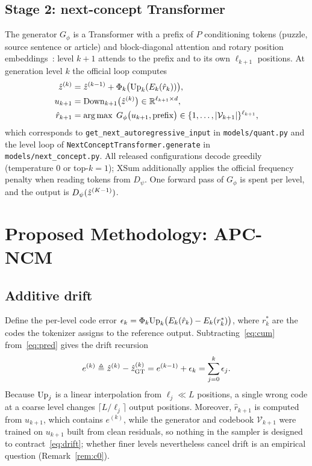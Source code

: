 \subsection{Stage 2: next-concept Transformer}
The generator $G_\phi$ is a Transformer with a prefix of $P$ conditioning tokens (puzzle, source sentence or article) and block-diagonal attention and rotary position embeddings~\citep{su2024roformer}: level $k+1$ attends to the prefix and to its own $\ell_{k+1}$ positions. At generation level $k$ the official loop computes
\begin{align}
\hat{z}^{(k)} &= \hat{z}^{(k-1)} + \Phi_k\big(\mathrm{Up}_k(E_k(\hat r_k))\big), \label{eq:pred}\\
u_{k+1} &= \mathrm{Down}_{k+1}\big(\hat{z}^{(k)}\big)\in\mathbb{R}^{\ell_{k+1}\times d},\label{eq:down}\\
\hat r_{k+1} &= \operatorname*{arg\,max}\; G_\phi\big(u_{k+1},\mathrm{prefix}\big)\in\{1,\dots,|\mathcal{V}_{k+1}|\}^{\ell_{k+1}}, \label{eq:gen}
\end{align}
which corresponds to \texttt{get\_next\_autoregressive\_input} in \texttt{models/quant.py} and the level loop of \texttt{NextConceptTransformer.generate} in \texttt{models/next\_concept.py}. All released configurations decode greedily (temperature 0 or top-$k=1$); XSum additionally applies the official frequency penalty when reading tokens from $D_\psi$. One forward pass of $G_\phi$ is spent per level, and the output is $D_\psi(\hat{z}^{(K-1)})$.

\section{Proposed Methodology: APC-NCM}
\subsection{Additive drift}
Define the per-level code error $\epsilon_k=\Phi_k\mathrm{Up}_k\big(E_k(\hat r_k)-E_k(r^\ast_k)\big)$, where $r^\ast_k$ are the codes the tokenizer assigns to the reference output. Subtracting~\eqref{eq:cum} from~\eqref{eq:pred} gives the drift recursion
\begin{equation}
e^{(k)}\triangleq\hat{z}^{(k)}-\hat{z}^{(k)}_{\mathrm{GT}} = e^{(k-1)}+\epsilon_k=\sum_{j=0}^{k}\epsilon_j. \label{eq:drift}
\end{equation}
Because $\mathrm{Up}_j$ is a linear interpolation from $\ell_j\ll L$ positions, a single wrong code at a coarse level changes $\lceil L/\ell_j\rceil$ output positions. Moreover, $\hat r_{k+1}$ is computed from $u_{k+1}$, which contains $e^{(k)}$, while the generator and codebook $\mathcal{V}_{k+1}$ were trained on $u_{k+1}$ built from clean residuals, so nothing in the sampler is designed to contract~\eqref{eq:drift}; whether finer levels nevertheless cancel drift is an empirical question (Remark~\ref{rem:c0}).


